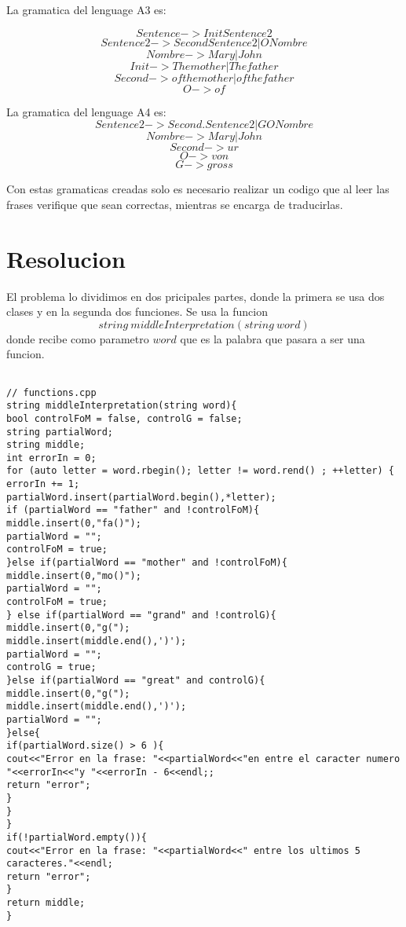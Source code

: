 \documentclass[conference]{IEEEtran}
\begin{document}
La gramatica del lenguage A3 es:

$$Sentence    -> Init Sentence2$$
$$Sentence2   -> Second Sentence2 | O Nombre $$
$$Nombre      -> Mary | John$$
$$Init        -> The mother | The father $$
$$Second      -> of the mother | of the father$$ 
$$O           -> of$$

La gramatica del lenguage A4 es:
$$Sentence2   -> Second.Sentence2 | G O Nombre $$
$$Nombre      -> Mary | John$$
$$Second      -> ur $$ 
$$O           -> von$$
$$G -> gross$$

Con estas gramaticas creadas solo es necesario realizar un codigo que al leer las frases verifique que sean correctas, mientras se encarga de traducirlas.

\section{Resolucion}

El problema lo dividimos en dos pricipales partes, donde la primera se usa dos clases y en la segunda dos funciones. Se usa la funcion $$string \  middleInterpretation(string \ word)$$
donde recibe como parametro $word$ que es la palabra que pasara a ser una funcion. 

\begin{lstlisting}

// functions.cpp
string middleInterpretation(string word){
bool controlFoM = false, controlG = false;
string partialWord;
string middle;
int errorIn = 0;
for (auto letter = word.rbegin(); letter != word.rend() ; ++letter) {
errorIn += 1;
partialWord.insert(partialWord.begin(),*letter);
if (partialWord == "father" and !controlFoM){
middle.insert(0,"fa()");
partialWord = "";
controlFoM = true;
}else if(partialWord == "mother" and !controlFoM){
middle.insert(0,"mo()");
partialWord = "";
controlFoM = true;
} else if(partialWord == "grand" and !controlG){
middle.insert(0,"g(");
middle.insert(middle.end(),')');
partialWord = "";
controlG = true;
}else if(partialWord == "great" and controlG){
middle.insert(0,"g(");
middle.insert(middle.end(),')');
partialWord = "";
}else{
if(partialWord.size() > 6 ){
cout<<"Error en la frase: "<<partialWord<<"en entre el caracter numero "<<errorIn<<"y "<<errorIn - 6<<endl;;
return "error";
}
}
}
if(!partialWord.empty()){
cout<<"Error en la frase: "<<partialWord<<" entre los ultimos 5 caracteres."<<endl;
return "error";
}
return middle;
}

\end{lstlisting}
	
\end{document}
